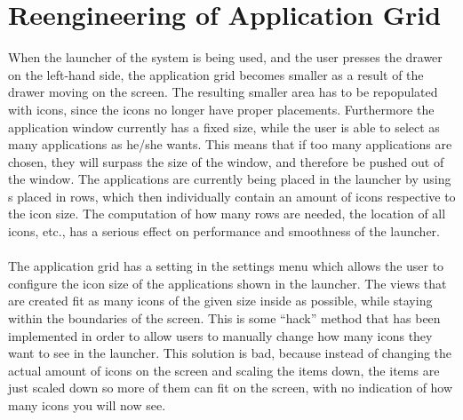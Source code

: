
\section{Reengineering of Application Grid}
\label{sec:reengineering_of_application_grid}

When the launcher of the \giraf system is being used, and the user presses the drawer on the left-hand side, the application grid becomes smaller as a result of the drawer moving on the screen. The resulting smaller area has to be repopulated with icons, since the icons no longer have proper placements. Furthermore the application window currently has a fixed size, while the user is able to select as many applications as he/she wants. This means that if too many applications are chosen, they will surpass the size of the window, and therefore be pushed out of the window. The applications are currently being placed in the launcher by using s placed in rows, which then individually contain an amount of icons respective to the icon size. The computation of how many rows are needed, the location of all icons, etc., has a serious effect on performance and smoothness of the launcher. 
\\\\
The application grid has a setting in the settings menu which allows the user to configure the icon size of the applications shown in the launcher. The  views that are created fit as many icons of the given size inside as possible, while staying within the boundaries of the screen. This is some ``hack'' method that has been implemented in order to allow users to manually change how many icons they want to see in the launcher. This solution is bad, because instead of changing the actual amount of icons on the screen and scaling the items down, the items are just scaled down so more of them can fit on the screen, with no indication of how many icons you will now see. 


